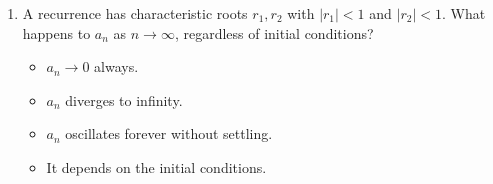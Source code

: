 \documentclass[11pt,a4paper]{article}
\begin{document}
\begin{enumerate}
\item A recurrence has characteristic roots $r_1,r_2$ with $|r_1|<1$ and $|r_2|<1$. What happens to $a_n$ as $n\to\infty$, regardless of initial conditions?
\begin{itemize}
\item[A)] $a_n\to0$ always.
\item[B)] $a_n$ diverges to infinity.
\item[C)] $a_n$ oscillates forever without settling.
\item[D)] It depends on the initial conditions.
\end{itemize}

\end{enumerate}

\end{document}
